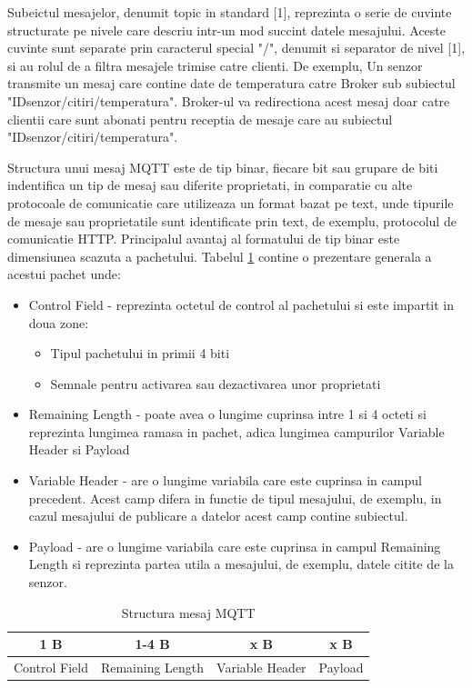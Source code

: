 Subeictul mesajelor, denumit topic in standard [1], reprezinta o serie de cuvinte structurate pe nivele care descriu intr-un mod succint datele mesajului. 
Aceste cuvinte sunt separate prin caracterul special "/", denumit si separator de nivel [1], si au rolul de a filtra mesajele trimise catre clienti. 
De exemplu, Un senzor transmite un mesaj care contine date de temperatura catre Broker sub subiectul "IDsenzor/citiri/temperatura". 
Broker-ul va redirectiona acest mesaj doar catre clientii care sunt abonati pentru receptia de mesaje care au subiectul "IDsenzor/citiri/temperatura".

Structura unui mesaj MQTT este de tip binar, fiecare bit sau grupare de biti indentifica un tip de mesaj sau diferite proprietati, in comparatie cu alte 
protocoale de comunicatie care utilizeaza un format bazat pe text, unde tipurile de mesaje sau proprietatile sunt identificate prin text, de exemplu,
protocolul de comunicatie HTTP. Principalul avantaj al formatului de tip binar este dimensiunea scazuta a pachetului. Tabelul \ref{tab:StructuraMesajMQTT} 
contine o prezentare generala a acestui pachet unde:
\begin{itemize}
	\item Control Field - reprezinta octetul de control al pachetului si este impartit in doua zone:
    \begin{itemize}
        \item Tipul pachetului in primii 4 biti
        \item Semnale pentru activarea sau dezactivarea unor proprietati
    \end{itemize}
	\item Remaining Length - poate avea o lungime cuprinsa intre 1 si 4 octeti si reprezinta lungimea ramasa in pachet, adica lungimea campurilor Variable Header 
    si Payload
	\item Variable Header - are o lungime variabila care este cuprinsa in campul precedent. Acest camp difera in functie de tipul mesajului, de exemplu, in 
	cazul mesajului de publicare a datelor acest camp contine subiectul.
	\item Payload - are o lungime variabila care este cuprinsa in campul Remaining Length si reprezinta partea utila a mesajului, de exemplu, datele citite de 
	la senzor.
\end{itemize}

\begin{table}[ht]
    \caption{Structura mesaj MQTT}
    \centering                          %
    \begin{tabular}{|c|c|c|c|}          %
        \hline
        1 B & 1-4 B & x B & x B \\ [0.5ex]   %
        \hline                              %
        Control Field & Remaining Length & Variable Header & Payload \\               %
        \hline
    \end{tabular}
    \label{tab:StructuraMesajMQTT}                %
\end{table}

